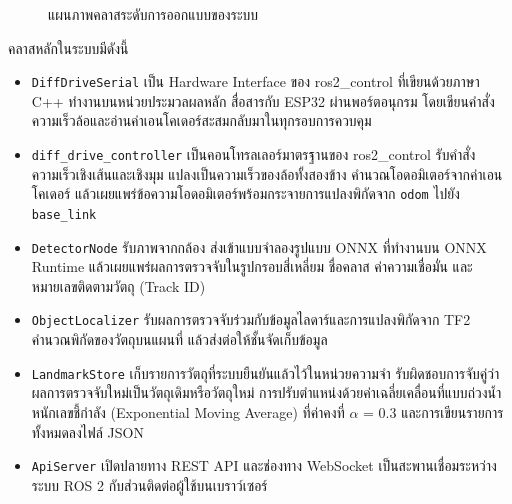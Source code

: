 \documentclass[a4paper,12pt]{report}
\begin{document}
\begin{figure}[htbp]
\caption[แผนภาพคลาสระดับการออกแบบของระบบ (บทที่ 3)]{แผนภาพคลาสระดับการออกแบบของระบบ}
\label{fig:class}
\end{figure}

คลาสหลักในระบบมีดังนี้

\begin{itemize}[leftmargin=1.25cm, itemsep=4pt, topsep=6pt]
    \item \texttt{DiffDriveSerial} เป็น Hardware Interface ของ ros2\_control
    ที่เขียนด้วยภาษา C++ ทำงานบนหน่วยประมวลผลหลัก สื่อสารกับ ESP32 ผ่านพอร์ตอนุกรม
    โดยเขียนคำสั่งความเร็วล้อและอ่านค่าเอนโคเดอร์สะสมกลับมาในทุกรอบการควบคุม

    \item \texttt{diff\_drive\_controller} เป็นคอนโทรลเลอร์มาตรฐานของ ros2\_control
    รับคำสั่งความเร็วเชิงเส้นและเชิงมุม แปลงเป็นความเร็วของล้อทั้งสองข้าง
    คำนวณโอดอมิเตอร์จากค่าเอนโคเดอร์
    แล้วเผยแพร่ข้อความโอดอมิเตอร์พร้อมกระจายการแปลงพิกัดจาก \texttt{odom}
    ไปยัง \texttt{base\_link}

    \item \texttt{DetectorNode} รับภาพจากกล้อง
    ส่งเข้าแบบจำลองรูปแบบ ONNX ที่ทำงานบน ONNX Runtime
    แล้วเผยแพร่ผลการตรวจจับในรูปกรอบสี่เหลี่ยม ชื่อคลาส ค่าความเชื่อมั่น
    และหมายเลขติดตามวัตถุ (Track ID)

    \item \texttt{ObjectLocalizer} รับผลการตรวจจับร่วมกับข้อมูลไลดาร์และการแปลงพิกัดจาก TF2
    คำนวณพิกัดของวัตถุบนแผนที่ แล้วส่งต่อให้ชั้นจัดเก็บข้อมูล

    \item \texttt{LandmarkStore} เก็บรายการวัตถุที่ระบบยืนยันแล้วไว้ในหน่วยความจำ
    รับผิดชอบการจับคู่ว่าผลการตรวจจับใหม่เป็นวัตถุเดิมหรือวัตถุใหม่
    การปรับตำแหน่งด้วยค่าเฉลี่ยเคลื่อนที่แบบถ่วงน้ำหนักเลขชี้กำลัง
    (Exponential Moving Average) ที่ค่าคงที่ $\alpha$ = 0.3
    และการเขียนรายการทั้งหมดลงไฟล์ JSON

    \item \texttt{ApiServer} เปิดปลายทาง REST API และช่องทาง WebSocket
    เป็นสะพานเชื่อมระหว่างระบบ ROS 2 กับส่วนติดต่อผู้ใช้บนเบราว์เซอร์
\end{itemize}
\end{document}
